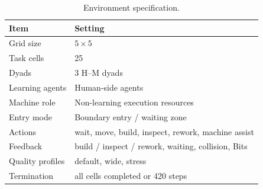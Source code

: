 \documentclass[preprint,12pt]{elsarticle}
\begin{document}
\begin{table}[htbp]
\centering
\caption{Scenario layers and their modeling roles.}
\label{tab:scenario_layers}
\end{table}



\begin{table}[htbp]
\centering
\caption{Environment specification.}
\label{tab:env_detail}
\begin{tabular}{ll}
\toprule
Item & Setting \\
\midrule
Grid size & $5\times5$ \\
Task cells & 25 \\
Dyads & 3 H--M dyads \\
Learning agents & Human-side agents \\
Machine role & Non-learning execution resources \\
Entry mode & Boundary entry / waiting zone \\
Actions & wait, move, build, inspect, rework, machine assist \\
Feedback & build / inspect / rework, waiting, collision, Bits \\
Quality profiles & default, wide, stress \\
Termination & all cells completed or 420 steps \\
\bottomrule
\end{tabular}
\end{table}
\end{document}
